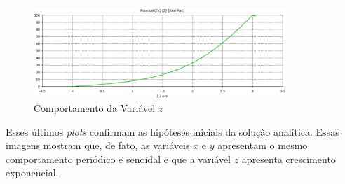 \documentclass{report}
\begin{document}
\begin{figure}[h!]
  \centering
  \includegraphics[width=0.85\textwidth]{images/plots/simulation_potential_z.png}
  \caption{\label{plot:simul_potential_z} Comportamento da Variável $ z $}
\end{figure}

Esses últimos \textit{plots} confirmam as hipóteses iniciais da solução analítica. Essas imagens mostram que,
de fato, as variáveis $ x $ e $ y $ apresentam o mesmo comportamento periódico e senoidal e que a variável $ z $
apresenta crescimento exponencial.
\end{document}
